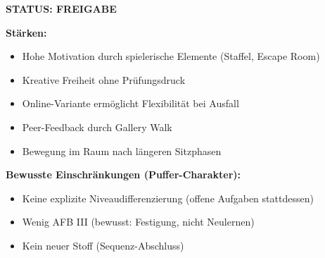 \documentclass[11pt,a4paper]{article}
\begin{document}
\begin{scorebox}
\vspace{1em}
\textcolor{successgreen}{\textbf{STATUS: FREIGABE}}

\vspace{1em}
\textbf{Stärken:}
\begin{itemize}
    \item Hohe Motivation durch spielerische Elemente (Staffel, Escape Room)
    \item Kreative Freiheit ohne Prüfungsdruck
    \item Online-Variante ermöglicht Flexibilität bei Ausfall
    \item Peer-Feedback durch Gallery Walk
    \item Bewegung im Raum nach längeren Sitzphasen
\end{itemize}

\textbf{Bewusste Einschränkungen (Puffer-Charakter):}
\begin{itemize}
    \item Keine explizite Niveaudifferenzierung (offene Aufgaben stattdessen)
    \item Wenig AFB III (bewusst: Festigung, nicht Neulernen)
    \item Kein neuer Stoff (Sequenz-Abschluss)
\end{itemize}

\end{scorebox}
\end{document}
